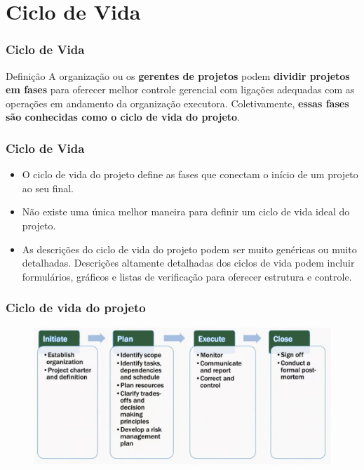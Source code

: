 
\section{Ciclo de Vida}



\begin{frame}
 \frametitle{Ciclo de Vida}
 \begin{block}{Definição}
  A organização ou os \textbf{gerentes de projetos} podem \textbf{dividir projetos em fases} para
oferecer melhor controle gerencial com ligações adequadas com as operações em
andamento da organização executora. Coletivamente, \textbf{essas fases são conhecidas
como o ciclo de vida do projeto}.
 \end{block}
\end{frame}


\begin{frame}
 \frametitle{Ciclo de Vida}
 \begin{itemize}
  \item O ciclo de vida do projeto define as fases que conectam o início de um projeto ao seu
final.
\item Não existe uma única melhor maneira para definir um ciclo de vida ideal do
projeto.
\item As descrições do ciclo de vida do projeto podem ser muito genéricas ou muito
detalhadas. Descrições altamente detalhadas dos ciclos de vida podem incluir
formulários, gráficos e listas de verificação para oferecer estrutura e controle.
 \end{itemize}
\end{frame}

\begin{frame}
 \frametitle{Ciclo de vida do projeto}
\begin{figure}
 \centering
 \includegraphics[width = \textwidth]{figs/fig0.png}
\end{figure}
\end{frame}


